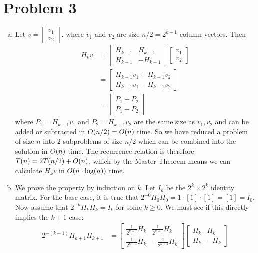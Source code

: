 \documentclass[11pt]{article}
\newcounter{problemnumber}
\let\origleft\left
\let\origright\right
\renewcommand{\left}{\mathopen{}\mathclose\bgroup\origleft}
\renewcommand{\right}{\aftergroup\egroup\origright}
\newcommand{\p}[1]{\left(#1\right)}
\renewcommand{\log}[1]{\text{log}\p{#1}}
\newcommand{\BigOh}[1]{O\p{#1}}
\begin{document}
\section*{Problem 3}
\begin{enumerate}[(a)]
\item Let $v=\begin{bmatrix}v_1\\v_2\end{bmatrix}$, where $v_1$ and $v_2$ are size $n/2 = 2^{k-1}$ column vectors. Then
\begin{align*}
H_k v &= \begin{bmatrix}H_{k-1}&H_{k-1}\\H_{k-1}&-H_{k-1}\end{bmatrix}\begin{bmatrix}v_1\\v_2\end{bmatrix} \\
&= \begin{bmatrix}H_{k-1}v_1+H_{k-1}v_2\\H_{k-1}v_1-H_{k-1}v_2\end{bmatrix} \\
&= \begin{bmatrix}P_1+P_2\\P_1-P_2\end{bmatrix}
\end{align*}
where $P_1=H_{k-1}v_1$ and $P_2=H_{k-1}v_2$ are the same size as $v_1,v_2$ and can be added or subtracted in $\BigOh{n/2} = \BigOh{n}$ time. So we have reduced a problem of size $n$ into $2$ subproblems of size $n/2$ which can be combined into the solution in $\BigOh{n}$ time. The recurrence relation is therefore $T(n) = 2T(n/2)+\BigOh{n}$, which by the Master Theorem means we can calculate $H_k v$ in $\BigOh{n\cdot\log n}$ time.
\item We prove the property by induction on $k$. Let $I_k$ be the $2^k\times 2^k$ identity matrix. For the base case, it is true that $2^{-0}H_0H_0 = 1\cdot [1]\cdot [1] = [1] = I_0$. Now assume that $2^{-k}H_kH_k = I_k$ for some $k\geq 0$. We must see if this directly implies the $k+1$ case:
\begin{align*}
2^{-(k+1)}H_{k+1}H_{k+1} &= \begin{bmatrix}\frac1{2^{k+1}}H_k&\frac1{2^{k+1}}H_k\\\frac1{2^{k+1}}H_k&-\frac1{2^{k+1}}H_k\end{bmatrix}\begin{bmatrix}H_k&H_k\\H_k&-H_k\end{bmatrix}  \\

\end{align*}
\end{enumerate}
\end{document}

